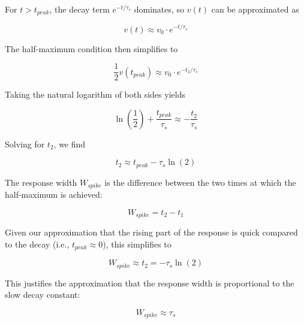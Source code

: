 For $t > t_{peak}$, the decay term $e^{-t/\tau_s}$ dominates, so $v(t)$ can be approximated as

\begin{equation}
v(t) \approx v_0 \cdot e^{-t/\tau_s}
\end{equation}

The half-maximum condition then simplifies to

\begin{equation}
\frac{1}{2} v(t_{peak}) \approx v_0 \cdot e^{-t_2/\tau_s}
\end{equation}

Taking the natural logarithm of both sides yields

\begin{equation}
\ln\left(\frac{1}{2}\right) + \frac{t_{peak}}{\tau_s} \approx -\frac{t_2}{\tau_s}
\end{equation}

Solving for $t_2$, we find

\begin{equation}
t_2 \approx t_{peak} - \tau_s \ln\left(2\right)
\end{equation}

The response width $W_{spike}$ is the difference between the two times at which the half-maximum is achieved:

\begin{equation}
W_{spike} = t_2 - t_1
\end{equation}

Given our approximation that the rising part of the response is quick compared to the decay (i.e., $t_{peak} \approx 0$), this simplifies to

\begin{equation}
W_{spike} \approx t_2 = -\tau_s \ln\left(2\right)
\end{equation}

This justifies the approximation that the response width is proportional to the slow decay constant:

\begin{equation}
W_{spike} \approx \tau_s
\end{equation}
